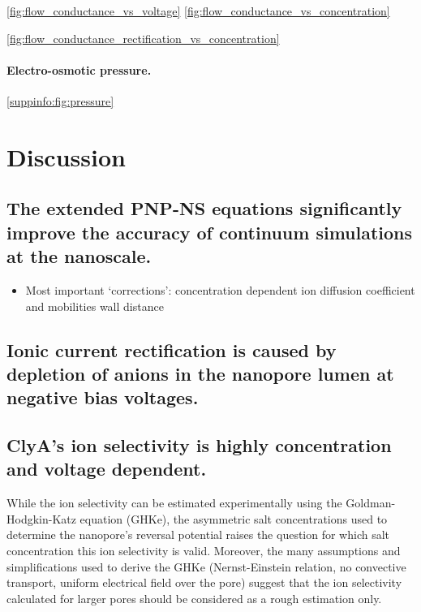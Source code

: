 \documentclass[journal=ancac3,manuscript=article,etalmode=truncate,maxauthors=0,layout=twocolumn]{achemso}
\begin{document}
\cite{Mao-2014,Laohakunakorn-2015}



\cref{fig:flow_conductance_vs_voltage}
\cref{fig:flow_conductance_vs_concentration}


\cref{fig:flow_conductance_rectification_vs_concentration}

\paragraph{Electro-osmotic pressure.}
\cref{suppinfo:fig:pressure}
\cite{Hoogerheide-2014}




\section{Discussion}\label{sect:discussion}

\subsection{The extended PNP-NS equations significantly improve the accuracy of continuum simulations at the 
nanoscale.}

\begin{itemize}
  \item Most important `corrections':
  \subitem concentration dependent ion diffusion coefficient and mobilities
  \subitem wall distance 
\end{itemize}

\subsection{Ionic current rectification is caused by depletion of anions in the nanopore lumen at negative 
bias voltages.}

\subsection{ClyA's ion selectivity is highly concentration and voltage dependent.}
While the ion selectivity can be estimated experimentally using the Goldman-Hodgkin-Katz 
equation (GHKe),\cite{Franceschini-2016,Huang-2017} the asymmetric salt concentrations used to determine the 
nanopore's reversal potential raises the question for which salt concentration this ion selectivity is valid.
Moreover, the many assumptions and simplifications used to derive the GHKe (Nernst-Einstein relation, no 
convective transport, uniform electrical field over the pore) suggest that the ion selectivity calculated for 
larger pores should be considered as a rough estimation only.
\end{document}
